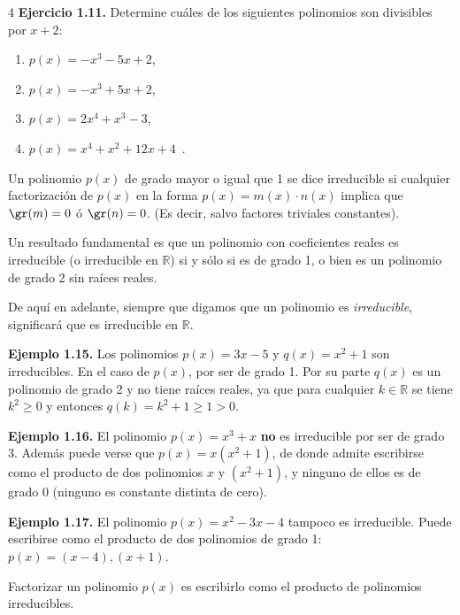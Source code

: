 \documentclass[11pt]{article}
\theoremstyle{plain}
\theoremstyle{definition}
\theoremstyle{definition}
\begin{document}
\begin{multicols}{4}
\noindent\textbf{Ejercicio 1.11.} Determine cuáles de los siguientes polinomios son divisibles por $x + 2$:

\begin{enumerate}
\item $p(x) = -x^3 - 5x + 2$,
\item $p(x) = -x^3 + 5x + 2$,
\item $p(x) = 2x^4 + x^3 - 3$,
\item $p(x) = x^4 + x^2 + 12x + 4$~.
\end{enumerate}

\begin{tcolorbox}[colback=blue!5!white,colframe=blue!75!black,title=\textbf{Definición (Polinomio irreducible)}]
Un polinomio $p(x)$ de grado mayor o igual que 1 se dice irreducible si cualquier factorización de $p(x)$ en la forma $p(x) = m(x)\cdot n(x)$ implica que $\gr(m) = 0$ ó $\gr(n) = 0$. (Es decir, salvo factores triviales constantes).
\end{tcolorbox}

Un resultado fundamental es que un polinomio con coeficientes reales es irreducible (o irreducible en $\mathbb{R}$) si y sólo si es de grado 1, o bien es un polinomio de grado 2 sin raíces reales.

\begin{observacion}[\textbf{1.6}] De aquí en adelante, siempre que digamos que un polinomio es \emph{irreducible}, significará que es irreducible en $\mathbb{R}$.
\end{observacion}

\noindent\textbf{Ejemplo 1.15.} Los polinomios $p(x) = 3x - 5$ y $q(x) = x^2 + 1$ son irreducibles. En el caso de $p(x)$, por ser de grado 1. Por su parte $q(x)$ es un polinomio de grado 2 y no tiene raíces reales, ya que para cualquier $k \in \mathbb{R}$ se tiene $k^2 \ge 0$ y entonces $q(k) = k^2 + 1 \ge 1 > 0$.

\noindent\textbf{Ejemplo 1.16.} El polinomio $p(x) = x^3 + x$ \textbf{no} es irreducible por ser de grado 3. Además puede verse que $p(x) = x(x^2 + 1)$, de donde admite escribirse como el producto de dos polinomios $x$ y $(x^2+1)$, y ninguno de ellos es de grado 0 (ninguno es constante distinta de cero).

\noindent\textbf{Ejemplo 1.17.} El polinomio $p(x) = x^2 - 3x - 4$ tampoco es irreducible. Puede escribirse como el producto de dos polinomios de grado 1: $p(x) = (x - 4),(x + 1)$.

\begin{tcolorbox}[colback=blue!5!white,colframe=blue!75!black,title=\textbf{Definición (Factorización de un polinomio)}]
Factorizar un polinomio $p(x)$ es escribirlo como el producto de polinomios irreducibles.


\end{tcolorbox}
\end{multicols}
\end{document}
